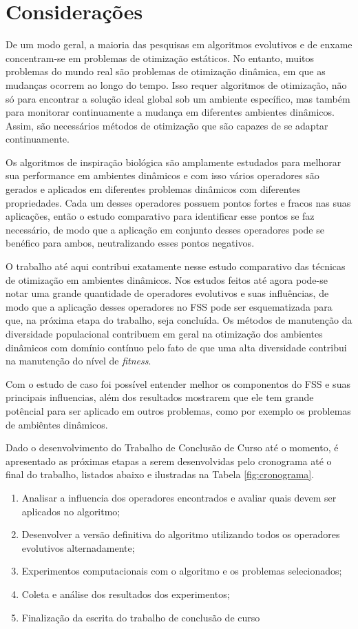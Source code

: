 \chapter{Considerações}
\label{ch:consideracoes}

De um modo geral, a maioria das pesquisas em algoritmos evolutivos e de enxame concentram-se em problemas de otimização estáticos. No entanto, muitos problemas do mundo real são problemas de otimização dinâmica, em que as mudanças ocorrem ao longo do tempo. Isso requer algoritmos de otimização, não só para encontrar a solução ideal global sob um ambiente específico, mas também para monitorar continuamente a mudança em diferentes ambientes dinâmicos. Assim, são necessários métodos de otimização que são capazes de se adaptar continuamente.

Os algoritmos de inspiração biológica são amplamente estudados para melhorar sua performance em ambientes dinâmicos e com isso vários operadores são gerados e aplicados em diferentes problemas dinâmicos com diferentes propriedades. Cada um desses operadores possuem pontos fortes e fracos nas suas aplicações, então o estudo comparativo para identificar esse pontos se faz necessário, de modo que a aplicação em conjunto desses operadores pode se benéfico para ambos, neutralizando esses pontos negativos.

O trabalho até aqui contribui exatamente nesse estudo comparativo das técnicas de otimização em ambientes dinâmicos. Nos estudos feitos até agora pode-se notar uma grande quantidade de operadores evolutivos e suas influências, de modo que a aplicação desses operadores no FSS pode ser esquematizada para que, na próxima etapa do trabalho, seja concluída. Os métodos de manutenção da diversidade populacional contribuem em geral na otimização dos ambientes dinâmicos com domínio contínuo pelo fato de que uma alta diversidade contribui na manutenção do nível de \textit{fitness}.

Com o estudo de caso foi possível entender melhor os componentos do FSS e suas principais influencias, além dos resultados mostrarem que ele tem grande potêncial para ser aplicado em outros problemas, como por exemplo os problemas de ambiêntes dinâmicos.

Dado o desenvolvimento do Trabalho de Conclusão de Curso até o momento, é apresentado as próximas etapas a serem desenvolvidas pelo cronograma até o final do trabalho, listados abaixo e ilustradas na Tabela \ref{fig:cronograma}.

\begin{enumerate}
\item Analisar a influencia dos operadores encontrados e avaliar quais devem ser aplicados no algoritmo;
\item Desenvolver a versão definitiva do algoritmo utilizando todos os operadores evolutivos alternadamente;
\item Experimentos computacionais com o algoritmo e os problemas selecionados;
\item Coleta e análise dos resultados dos experimentos; 
\item Finalização da escrita do trabalho de conclusão de curso
\end{enumerate}


